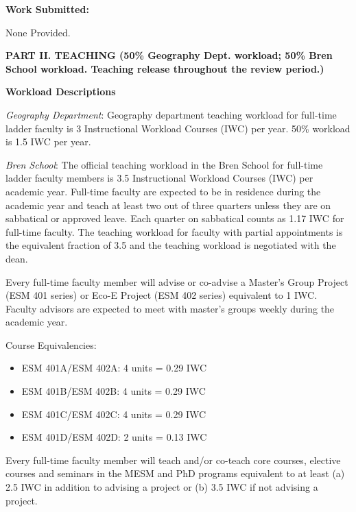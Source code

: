 \documentclass[10pt]{article}
\begin{document}
{\bf Work Submitted:}


% 
None Provided.


\vspace{1cm}
\textbf{PART II.  TEACHING (50\% Geography Dept. workload; 50\% Bren School workload. Teaching release throughout the review period.)}

\vspace{0.5cm}

\textbf{Workload Descriptions}

\begin{enumerate}
{\footnotesize

\item {\em Geography Department}: Geography department teaching workload for full-time ladder faculty is 3 Instructional Workload Courses (IWC) per year. 50\% workload is 1.5 IWC per year.

\item {\em Bren School}:  The official teaching workload in the Bren School for full-time ladder faculty members is 3.5 Instructional Workload Courses (IWC) per academic year. Full-time faculty are expected to be in residence during the academic year and teach at least two out of three quarters unless they are on sabbatical or approved leave. Each quarter on sabbatical counts as 1.17 IWC for full-time faculty. The teaching workload for faculty with partial appointments is the equivalent fraction of 3.5 and the teaching workload is negotiated with the dean.

Every full-time faculty member will advise or co-advise a Master’s Group Project (ESM 401 series) or Eco-E Project (ESM 402 series) equivalent to 1 IWC. Faculty advisors are expected to meet with master’s groups weekly during the academic year.

Course Equivalencies:
\begin{itemize}
    \item ESM 401A/ESM 402A: 4 units = 0.29 IWC 
    \item ESM 401B/ESM 402B: 4 units = 0.29 IWC
    \item ESM 401C/ESM 402C: 4 units = 0.29 IWC
    \item ESM 401D/ESM 402D: 2 units = 0.13 IWC
\end{itemize}

Every full-time faculty member will teach and/or co-teach core courses, elective courses and seminars in the MESM and PhD programs equivalent to at least (a) 2.5 IWC in addition to advising a project or (b) 3.5 IWC if not advising a project. 

}
\end{enumerate}
\end{document}
